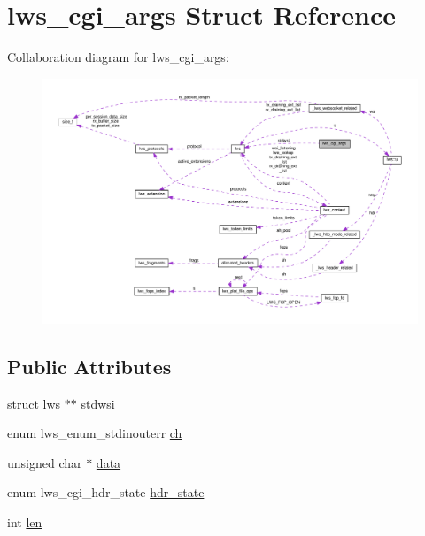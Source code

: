 \hypertarget{structlws__cgi__args}{}\section{lws\+\_\+cgi\+\_\+args Struct Reference}
\label{structlws__cgi__args}


Collaboration diagram for lws\+\_\+cgi\+\_\+args\+:
\nopagebreak
\begin{figure}[H]
\begin{center}
\leavevmode
\includegraphics[width=350pt]{structlws__cgi__args__coll__graph}
\end{center}
\end{figure}
\subsection*{Public Attributes}
\begin{DoxyCompactItemize}
\item 
struct \hyperlink{structlws}{lws} $\ast$$\ast$ \hyperlink{structlws__cgi__args_a43f9e6d1114eff299fb454fc431f27b8}{stdwsi}
\item 
enum lws\+\_\+enum\+\_\+stdinouterr \hyperlink{structlws__cgi__args_adeee220b29aeacc34632c38e50f0f5a5}{ch}
\item 
unsigned char $\ast$ \hyperlink{structlws__cgi__args_a9e3bd3f8d4de48053a878f00e82d616a}{data}
\item 
enum lws\+\_\+cgi\+\_\+hdr\+\_\+state \hyperlink{structlws__cgi__args_a741c11b9aa05997ec45a3400d7fb7739}{hdr\+\_\+state}
\item 
int \hyperlink{structlws__cgi__args_a36e5c256433c187bd0eaa9c1ca667f1d}{len}
\end{DoxyCompactItemize}


